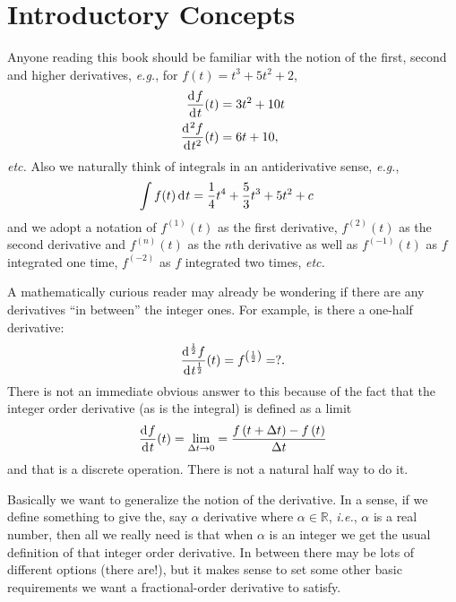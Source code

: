 \section{Introductory Concepts}
Anyone reading this book should be familiar with the notion of the first, second and higher derivatives, \textit{e.g.}, for $f(t) = t^3 + 5 t^2 + 2$, 
\begin{align}
  \frac{\operatorname{d}\hspace*{-1pt} f}{\operatorname{d}\hspace*{-1pt} t}(t) &= 3 t^2 + 10 t \\
  \frac{\operatorname{d}\hspace*{-1pt}^2 f}{\operatorname{d}\hspace*{-1pt} t^2}(t) &= 6t + 10, 
  \label{eq:derivs}
\end{align}
\textit{etc.} Also we naturally think of integrals in an antiderivative sense, \textit{e.g.},
\begin{align}
  \int f(t) \operatorname{d}\hspace*{-1pt} t &= \frac{1}{4} t^4 + \frac{5}{3} t^3 + 5 t^2 + c 
  \label{eq:integrals}
\end{align}
and we adopt a notation of $f^{(1)}(t)$ as the first derivative, $f^{(2)}(t)$ as the second derivative and $f^{(n)}(t)$ as the $n$th derivative as well as $f^{(-1)}(t)$ as $f$ integrated one time, $f^{(-2)}$ as $f$ integrated two times, \textit{etc.}

A mathematically curious reader may already be wondering if there are any derivatives ``in between'' the integer ones.
For example, is there a one-half derivative:
\begin{equation}
  \frac{\operatorname{d}\hspace*{-1pt}^\frac{1}{2} f}{\operatorname{d}\hspace*{-1pt} t^\frac{1}{2}}(t) = f^{\left(\frac{1}{2}\right)} = ?.
  \label{eq:halfderiv}
\end{equation}
There is not an immediate obvious answer to this because of the fact that the integer order derivative (as is the integral) is defined as a limit
\begin{equation}
  \frac{\operatorname{d}\hspace*{-1pt} f}{\operatorname{d}\hspace*{-1pt} t}(t) = \lim_{\Delta t \rightarrow 0} = \frac{f\left(t + \Delta t \right) - f\left(t\right)}{\Delta t}
  \label{eq:limdef}
\end{equation}
and that is a discrete operation. There is not a natural half way to do it.

Basically we want to generalize the notion of the derivative. In a sense, if we define something to give the, say $\alpha$ derivative where $\alpha \in \mathbb R$, \textit{i.e.}, $\alpha$ is a real number, then all we really need is that when $\alpha$ is an integer we get the usual definition of that integer order derivative. In between there may be lots of different options (there are!), but it makes sense to set some other basic requirements we want a fractional-order derivative to satisfy.

